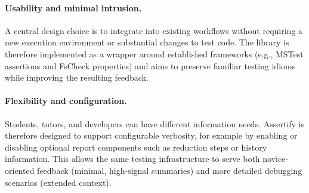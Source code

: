 \paragraph{Usability and minimal intrusion.}%
\label{par:usability-and-minimal-intrusion} A central design choice is to
integrate into existing workflows without requiring a new execution environment
or substantial changes to test code. The library is therefore implemented as a
wrapper around established frameworks (e.g., MSTest assertions and FsCheck
properties) and aims to preserve familiar testing idioms while improving the
resulting feedback.


\paragraph{Flexibility and configuration.}%
\label{par:flexibility-and-configuration} Students, tutors, and developers can
have different information needs. Assertify is therefore designed to support
configurable verbosity, for example by enabling or disabling optional report
components such as reduction steps or history information. This allows the same
testing infrastructure to serve both novice-oriented feedback (minimal,
high-signal summaries) and more detailed debugging scenarios (extended context).


